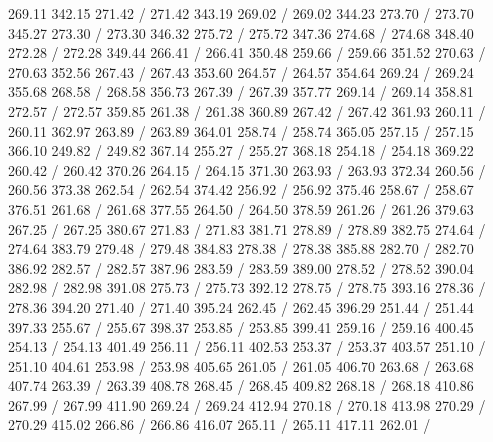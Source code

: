 { 269.11 342.15 271.42 /
 271.42 343.19 269.02 /
 269.02 344.23 273.70 /
 273.70 345.27 273.30 /
 273.30 346.32 275.72 /
 275.72 347.36 274.68 /
 274.68 348.40 272.28 /
 272.28 349.44 266.41 /
 266.41 350.48 259.66 /
 259.66 351.52 270.63 /
 270.63 352.56 267.43 /
 267.43 353.60 264.57 /
 264.57 354.64 269.24 /
 269.24 355.68 268.58 /
 268.58 356.73 267.39 /
 267.39 357.77 269.14 /
 269.14 358.81 272.57 /
 272.57 359.85 261.38 /
 261.38 360.89 267.42 /
 267.42 361.93 260.11 /
 260.11 362.97 263.89 /
 263.89 364.01 258.74 /
 258.74 365.05 257.15 /
 257.15 366.10 249.82 /
 249.82 367.14 255.27 /
 255.27 368.18 254.18 /
 254.18 369.22 260.42 /
 260.42 370.26 264.15 /
 264.15 371.30 263.93 /
 263.93 372.34 260.56 /
 260.56 373.38 262.54 /
 262.54 374.42 256.92 /
 256.92 375.46 258.67 /
 258.67 376.51 261.68 /
 261.68 377.55 264.50 /
 264.50 378.59 261.26 /
 261.26 379.63 267.25 /
 267.25 380.67 271.83 /
 271.83 381.71 278.89 /
 278.89 382.75 274.64 /
 274.64 383.79 279.48 /
 279.48 384.83 278.38 /
 278.38 385.88 282.70 /
 282.70 386.92 282.57 /
 282.57 387.96 283.59 /
 283.59 389.00 278.52 /
 278.52 390.04 282.98 /
 282.98 391.08 275.73 /
 275.73 392.12 278.75 /
 278.75 393.16 278.36 /
 278.36 394.20 271.40 /
 271.40 395.24 262.45 /
 262.45 396.29 251.44 /
 251.44 397.33 255.67 /
 255.67 398.37 253.85 /
 253.85 399.41 259.16 /
 259.16 400.45 254.13 /
 254.13 401.49 256.11 /
 256.11 402.53 253.37 /
 253.37 403.57 251.10 /
 251.10 404.61 253.98 /
 253.98 405.65 261.05 /
 261.05 406.70 263.68 /
 263.68 407.74 263.39 /
 263.39 408.78 268.45 /
 268.45 409.82 268.18 /
 268.18 410.86 267.99 /
 267.99 411.90 269.24 /
 269.24 412.94 270.18 /
 270.18 413.98 270.29 /
 270.29 415.02 266.86 /
 266.86 416.07 265.11 /
 265.11 417.11 262.01 /
}
